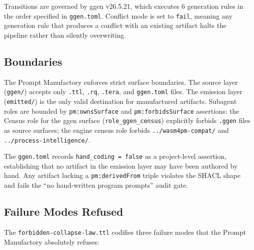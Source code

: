 Transitions are governed by ggen v26.5.21, which executes 6 generation rules in the order
specified in \texttt{ggen.toml}. Conflict mode is set to \texttt{fail}, meaning any
generation rule that produces a conflict with an existing artifact halts the pipeline rather
than silently overwriting.

\subsection{Boundaries}
\label{sec:research-prompt-manufactory-architecture-boundaries}

The Prompt Manufactory enforces strict surface boundaries. The source layer (\texttt{ggen/})
accepts only \texttt{.ttl}, \texttt{.rq}, \texttt{.tera}, and \texttt{ggen.toml} files.
The emission layer (\texttt{emitted/}) is the only valid destination for manufactured
artifacts. Subagent roles are bounded by \texttt{pm:ownsSurface} and
\texttt{pm:forbidsSurface} assertions: the Census role for the ggen surface
(\texttt{role\_ggen\_census}) explicitly forbids \texttt{.ggen} files as source surfaces;
the engine census role forbids \texttt{../wasm4pm-compat/} and
\texttt{../process-intelligence/}.

The \texttt{ggen.toml} records \texttt{hand\_coding = false} as a project-level assertion,
establishing that no artifact in the emission layer may have been authored by hand. Any
artifact lacking a \texttt{pm:derivedFrom} triple violates the SHACL shape and fails the
``no hand-written program prompts'' audit gate.

\subsection{Failure Modes Refused}
\label{sec:research-prompt-manufactory-architecture-failures}

The \texttt{forbidden-collapse-law.ttl} codifies three failure modes that the Prompt
Manufactory absolutely refuses:

